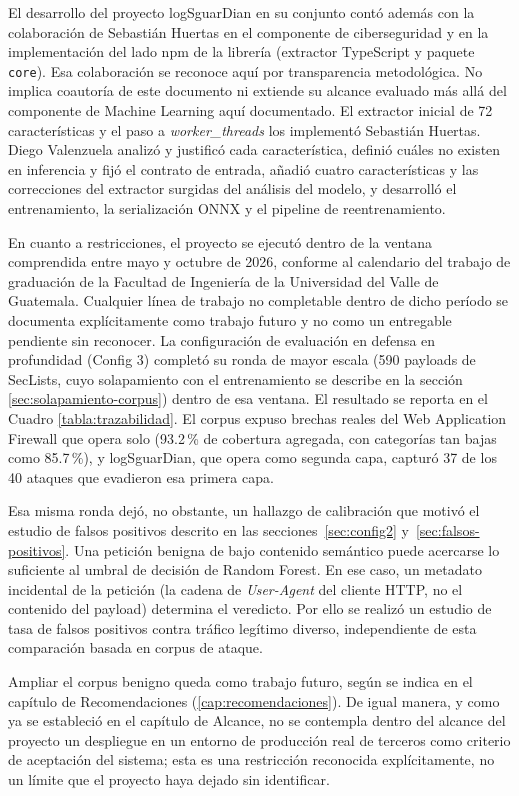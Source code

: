 El desarrollo del proyecto logSguarDian en su conjunto contó además con la colaboración de Sebastián Huertas en el componente de ciberseguridad y en la implementación del lado npm de la librería (extractor TypeScript y paquete \texttt{core}). Esa colaboración se reconoce aquí por transparencia metodológica. No implica coautoría de este documento ni extiende su alcance evaluado más allá del componente de Machine Learning aquí documentado. El extractor inicial de 72 características y el paso a \textit{worker\_threads} los implementó Sebastián Huertas. Diego Valenzuela analizó y justificó cada característica, definió cuáles no existen en inferencia y fijó el contrato de entrada, añadió cuatro características y las correcciones del extractor surgidas del análisis del modelo, y desarrolló el entrenamiento, la serialización ONNX y el pipeline de reentrenamiento.

En cuanto a restricciones, el proyecto se ejecutó dentro de la ventana comprendida entre mayo y octubre de 2026, conforme al calendario del trabajo de graduación de la Facultad de Ingeniería de la Universidad del Valle de Guatemala. Cualquier línea de trabajo no completable dentro de dicho período se documenta explícitamente como trabajo futuro y no como un entregable pendiente sin reconocer. La configuración de evaluación en defensa en profundidad (Config 3) completó su ronda de mayor escala (590 payloads de SecLists, cuyo solapamiento con el entrenamiento se describe en la sección \ref{sec:solapamiento-corpus}) dentro de esa ventana. El resultado se reporta en el Cuadro \ref{tabla:trazabilidad}. El corpus expuso brechas reales del Web Application Firewall que opera solo (93.2\,\% de cobertura agregada, con categorías tan bajas como 85.7\,\%), y logSguarDian, que opera como segunda capa, capturó 37 de los 40 ataques que evadieron esa primera capa.

Esa misma ronda dejó, no obstante, un hallazgo de calibración que motivó el estudio de falsos positivos descrito en las secciones~\ref{sec:config2} y~\ref{sec:falsos-positivos}. Una petición benigna de bajo contenido semántico puede acercarse lo suficiente al umbral de decisión de Random Forest. En ese caso, un metadato incidental de la petición (la cadena de \textit{User-Agent} del cliente HTTP, no el contenido del payload) determina el veredicto. Por ello se realizó un estudio de tasa de falsos positivos contra tráfico legítimo diverso, independiente de esta comparación basada en corpus de ataque.

Ampliar el corpus benigno queda como trabajo futuro, según se indica en el capítulo de Recomendaciones (\ref{cap:recomendaciones}). De igual manera, y como ya se estableció en el capítulo de Alcance, no se contempla dentro del alcance del proyecto un despliegue en un entorno de producción real de terceros como criterio de aceptación del sistema; esta es una restricción reconocida explícitamente, no un límite que el proyecto haya dejado sin identificar.

